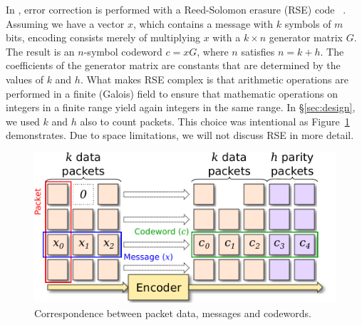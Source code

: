 
In \OurSys, error correction is performed with a Reed-Solomon erasure (RSE) code~\cite{rse}
.
Assuming we have a vector $x$,
which contains a message with $k$ symbols of $m$ bits, encoding consists merely
of multiplying $x$ with a $k \times n$ generator matrix $G$. The result is an
$n$-symbol codeword $c = xG$, where $n$ satisfies $n = k + h$.   The coefficients of the
generator matrix are constants that are determined by the values of $k$ and
$h$.
What makes RSE complex is that arithmetic operations are performed in a finite (Galois)
field to ensure that mathematic operations on integers in a finite range yield
again integers in the same range.  
In \S\ref{sec:design}, we used $k$ and $h$ also to count packets.  This choice was intentional as
Figure~\ref{fig:Striping} demonstrates.
Due to space limitations, we will not discuss RSE in more detail.

\begin{figure}
  \centering
  \includegraphics[width=0.4\paperwidth]{Striping.pdf}
  \caption{\label{fig:Striping} Correspondence between packet data, messages and codewords.
  }
\end{figure}

